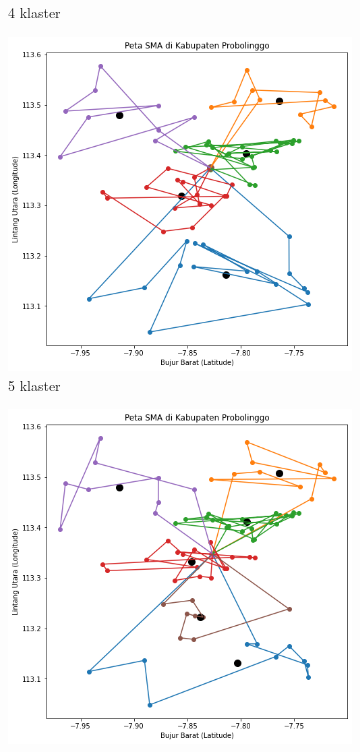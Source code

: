 \begin{figure}[H]
\begin{subfigure}[b]{0.3\textwidth}
		\caption{4 klaster}	
	\end{subfigure}
	\hfill
	\begin{subfigure}[b]{0.3\textwidth}
		\includegraphics[width=\textwidth]{Gambar/Klaster/5.png}
		\caption{5 klaster}	
	\end{subfigure}
	\hfill
	\begin{subfigure}[b]{0.3\textwidth}
		\includegraphics[width=\textwidth]{Gambar/Klaster/6.png}

\end{subfigure}
\end{figure}
